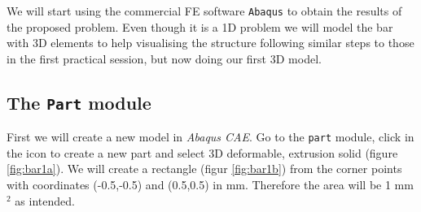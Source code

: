 \documentclass[spanish,a4paper,12pt]{article}
\begin{document}
We will start using the commercial FE software \texttt{Abaqus} to obtain the results of the proposed problem.
Even though it is a 1D problem we will model the bar with 3D elements to help visualising the structure following similar steps to those in the first practical session, but now doing our first 3D model.

\subsection{The \texttt{Part} module}


First we will create a new model in \emph{Abaqus CAE}. Go to the \texttt{part} module, click in the icon to create a new part and select 3D deformable, extrusion solid (figure \ref{fig:bar1a}). We will create a rectangle (figur \ref{fig:bar1b}) from the corner points with coordinates (-0.5,-0.5) and (0.5,0.5) in mm. Therefore the area will be 1 mm$^2$ as intended.
\end{document}
